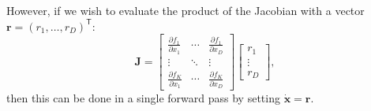 \documentclass{article}
\begin{document}
However, if we wish to evaluate the product of the Jacobian with a vector $\mathbf{r} = (r_1, \dots, r_D)^{\mathsf{T}}$:
\begin{equation}
\mathbf{J} = 
\begin{bmatrix}
\displaystyle \frac{\partial f_1}{\partial x_1} & \cdots & \displaystyle \frac{\partial f_1}{\partial x_D} \\
\vdots & \ddots & \vdots \\
\displaystyle \frac{\partial f_K}{\partial x_1} & \cdots & \displaystyle \frac{\partial f_K}{\partial x_D}
\end{bmatrix}
\begin{bmatrix}
r_1 \\ \vdots \\ r_D
\end{bmatrix},
\tag{8.67}
\end{equation}
then this can be done in a single forward pass by setting $\dot{\mathbf{x}} = \mathbf{r}$.

\end{document}
